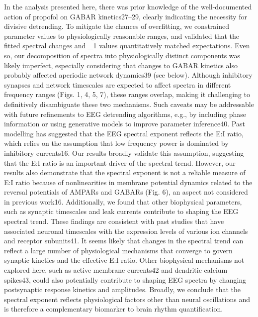 In the analysis presented here, there was prior knowledge of the well-documented action of propofol on GABAR kinetics27–29, clearly indicating the necessity for divisive detrending. To mitigate the chances of overfitting, we constrained parameter values to physiologically reasonable ranges, and validated that the fitted spectral changes and \tau_1 values quantitatively matched expectations. Even so, our decomposition of spectra into physiologically distinct components was likely imperfect, especially considering that changes to GABAR kinetics also probably affected aperiodic network dynamics39 (see below). Although inhibitory synapses and network timescales are expected to affect spectra in different frequency ranges (Figs. 1, 4, 5, 7), these ranges overlap, making it challenging to definitively disambiguate these two mechanisms. Such caveats may be addressable with future refinements to EEG detrending algorithms, e.g., by including phase information or using generative models to improve parameter inference40. 
Past modelling has suggested that the EEG spectral exponent reflects the E:I ratio, which relies on the assumption that low frequency power is dominated by inhibitory currents16. Our results broadly validate this assumption, suggesting that the E:I ratio is an important driver of the spectral trend. However, our results also demonstrate that the spectral exponent is not a reliable measure of E:I ratio because of nonlinearities in membrane potential dynamics related to the reversal potentials of AMPARs and GABARs (Fig. 6), an aspect not considered in previous work16. Additionally, we found that other biophysical parameters, such as synaptic timescales and leak currents contribute to shaping the EEG spectral trend. These findings are consistent with past studies that have associated neuronal timescales with the expression levels of various ion channels and receptor subunits41. It seems likely that changes in the spectral trend can reflect a large number of physiological mechanisms that converge to govern synaptic kinetics and the effective E:I ratio. Other biophysical mechanisms not explored here, such as active membrane currents42 and dendritic calcium spikes43, could also potentially contribute to shaping EEG spectra by changing postsynaptic response kinetics and amplitudes. Broadly, we conclude that the spectral exponent reflects physiological factors other than neural oscillations and is therefore a complementary biomarker to brain rhythm quantification.
